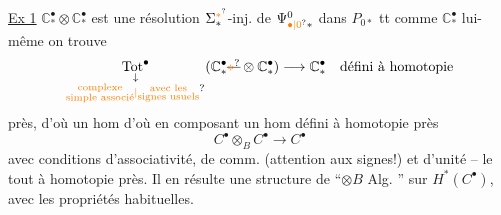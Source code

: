 \uline{Ex 1}   $\mathbb{C}^{\bullet}_*\otimes \mathbb{C}^{\bullet}_*$ est une résolution $\Sigma^{\unsure{*}}_*$-inj. de $\Psi^0_{\unsure{\bullet|0}*}$ dans $P_{0*}$ tt comme $\mathbb{C}^{\bullet}_*$ lui-même on trouve
\[
\underset{\substack{\downarrow\\\unsure{\substack{\text{complexe}\\\text{simple associé}}|\substack{\text{avec les}\\\text{signes usuels}}}}}{\operatorname{Tot}^{\bullet}}(\mathbb{C}^{\bullet}_*\deleted{\unsure{\ast}}\otimes \mathbb{C}^{\bullet}_*)\longrightarrow \mathbb{C}^{\bullet}_*\quad\text{défini à homotopie}
\]
près, d'où un hom
d'où en composant un hom défini à homotopie près
\[
C^{\bullet}\otimes_B C^{\bullet}\longrightarrow C^{\bullet}
\]
avec conditions d'associativité, de comm. (attention aux signes!) et d'unité -- le tout à homotopie près. Il en résulte une structure de ``$\otimes B$ Alg. '' sur $H^*(C^{\bullet})$, avec les propriétés habituelles.
